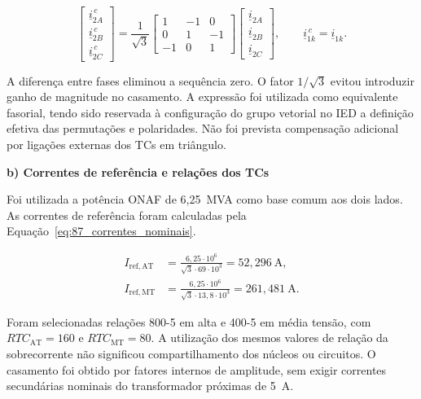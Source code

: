 \begin{equation}
    \begin{bmatrix}
        \underline{i}_{2A}^{\,c}\\
        \underline{i}_{2B}^{\,c}\\
        \underline{i}_{2C}^{\,c}
    \end{bmatrix}
    =\frac{1}{\sqrt{3}}
    \begin{bmatrix}
        1&-1&0\\
        0&1&-1\\
        -1&0&1
    \end{bmatrix}
    \begin{bmatrix}
        \underline{i}_{2A}\\
        \underline{i}_{2B}\\
        \underline{i}_{2C}
    \end{bmatrix},
    \qquad \underline{i}_{1k}^{\,c}=\underline{i}_{1k}.
    \label{eq:87_compensacao}
\end{equation}

A diferença entre fases eliminou a sequência zero. O fator $1/\sqrt{3}$ evitou introduzir ganho de magnitude no casamento. A expressão foi utilizada como equivalente fasorial, tendo sido reservada à configuração do grupo vetorial no IED a definição efetiva das permutações e polaridades. Não foi prevista compensação adicional por ligações externas dos TCs em triângulo.

\textbf{b) Correntes de referência e relações dos TCs}

Foi utilizada a potência ONAF de 6,25~MVA como base comum aos dois lados. As correntes de referência foram calculadas pela Equação~\eqref{eq:87_correntes_nominais}.

\begin{equation}
    \begin{aligned}
        I_{\mathrm{ref,AT}}&=\frac{6{,}25\cdot10^6}
        {\sqrt{3}\cdot69\cdot10^3}=52{,}296~\mathrm{A},\\
        I_{\mathrm{ref,MT}}&=\frac{6{,}25\cdot10^6}
        {\sqrt{3}\cdot13{,}8\cdot10^3}=261{,}481~\mathrm{A}.
    \end{aligned}
    \label{eq:87_correntes_nominais}
\end{equation}

Foram selecionadas relações 800-5 em alta e 400-5 em média tensão, com $RTC_{\mathrm{AT}}=160$ e $RTC_{\mathrm{MT}}=80$. A utilização dos mesmos valores de relação da sobrecorrente não significou compartilhamento dos núcleos ou circuitos. O casamento foi obtido por fatores internos de amplitude, sem exigir correntes secundárias nominais do transformador próximas de 5~A.

